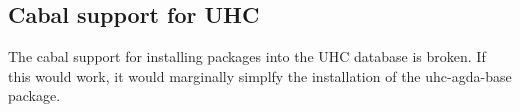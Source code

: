 \documentclass[12pt, a4paper, twoside]{report}
\begin{document}
\subsection{Cabal support for UHC}
The cabal support for installing packages into the UHC database is broken. If this would work, it
would marginally simplfy the installation of the uhc-agda-base package.


{}

\end{document}

